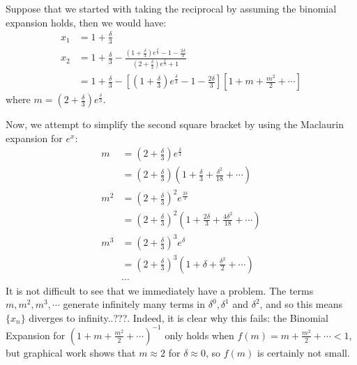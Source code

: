 \documentclass[../main.tex]{subfiles}
\begin{document}
Suppose that we started with taking the reciprocal by assuming the binomial expansion holds, then we would have:
\begin{align*}
    x_1 &= 1+\frac{\delta}{3}\\
    x_2 &= 1+\frac{\delta}{3}-\frac{\left(1+\frac{\delta}{3}\right)e^{\frac{\delta}{3}}-1-\frac{2\delta}{3}}{\left(2+\frac{\delta}{3}\right)e^\frac{\delta}{3}+1} \\
    &= 1+\frac{\delta}{3}-\left[\left(1+\frac{\delta}{3}\right)e^{\frac{\delta}{3}}-1-\frac{2\delta}{3}\right]\left[1+m+\frac{m^2}{2}+\cdots\right]
\end{align*}
where $m=\left(2+\frac{\delta}{3}\right)e^\frac{\delta}{3}$.

Now, we attempt to simplify the second square bracket by using the Maclaurin expansion for $e^x:$
\begin{align*}
    m &= \left(2+\frac{\delta}{3}\right)e^\frac{\delta}{3} \\ &= \left(2+\frac{\delta}{3}\right)\left(1+\frac{\delta}{3}+\frac{\delta^2}{18}+\cdots\right) \\
    m^2 &= \left(2+\frac{\delta}{3}\right)^2e^\frac{2\delta}{3} \\ &= \left(2+\frac{\delta}{3}\right)^2\left(1+\frac{2\delta}{3}+\frac{4\delta^2}{18}+\cdots\right) \\
    m^3 &= \left(2+\frac{\delta}{3}\right)^3e^\delta \\ &= \left(2+\frac{\delta}{3}\right)^3\left(1+\delta+\frac{\delta^2}{2}+\cdots\right)\\
    &\cdots
\end{align*}
It is not difficult to see that we immediately have a problem. The terms $m, m^2, m^3, \cdots$ generate infinitely many terms in $\delta^0, \delta^1$ and $\delta^2$, and so this means $\{x_n\}$ diverges to infinity..???. Indeed, it is clear why this fails: the Binomial Expansion for $(1+m+\frac{m^2}{2}+\cdots)^{-1}$ only holds when $f(m)=m+\frac{m^2}{2}+\cdots < 1$, but graphical work shows that $m\approx 2$ for $\delta \approx 0$, so $f(m)$ is certainly not small. 
\end{document}
